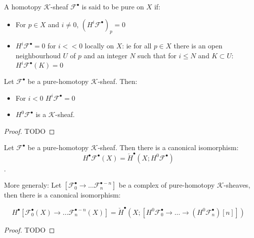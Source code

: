 

\begin{definition}\label{def:pure_homotopy_k_sheaf}
    A homotopy $\mathcal{K}$-sheaf $\mathcal{F}^{\bullet}$ is said to be pure on $X$ if: \begin{itemize}
        \item For $p\in X$ and $i\neq 0$, $(H^i\mathcal{F}^{\bullet})_p=0$
        \item $H^i\mathcal{F}^{\bullet}=0$ for $i<<0$ locally on $X$: ie for all $p\in X$ there is an open neighbourhoud $U$ of $p$ and an integer $N$ such that for $i\leq N$ and $K\subset U$: $H^i\mathcal{F}^{\bullet}(K)=0$
    \end{itemize}
\end{definition}

\begin{lemma}\label{lem:csq_of_pure_homotopy_k_sheaf}
    Let $\mathcal{F}^{\bullet}$ be a pure-homotopy $\mathcal{K}$-sheaf. Then: \begin{itemize}
        \item For $i<0$ $H^i\mathcal{F}^{\bullet}=0$
        \item $H^0\mathcal{F}^{\bullet}$ is a $\mathcal{K}$-sheaf.
    \end{itemize}
\end{lemma}

\begin{proof}
    TODO
\end{proof}

\begin{proposition}\label{prop:cech_of_pure_homotopy_k_sheaf}
    Let $\mathcal{F}^{\bullet}$ be a pure-homotopy $\mathcal{K}$-sheaf. Then there is a canonical isomorphism:
    \[H^{\bullet}\mathcal{F}^{\bullet}(X)=\check{H}^{\bullet}(X;H^0\mathcal{F}^{\bullet})\].

    More generaly: Let $[\mathcal{F}_0^{\bullet}\to \ldots\mathcal{F}_n^{\bullet-n}]$  be a complex of pure-homotopy $\mathcal{K}$-sheaves, then there is a canonical isomorphism:

    \[H^{\bullet}[\mathcal{F}_0^{\bullet}(X)\to \ldots\mathcal{F}_n^{\bullet-n}(X)]=\check{H}^{\bullet}(X;[H^0\mathcal{F}_0^{\bullet}\to\ldots\to (H^0\mathcal{F}_n^{\bullet})[n]])\]
\end{proposition}

\begin{proof}
    TODO
\end{proof}